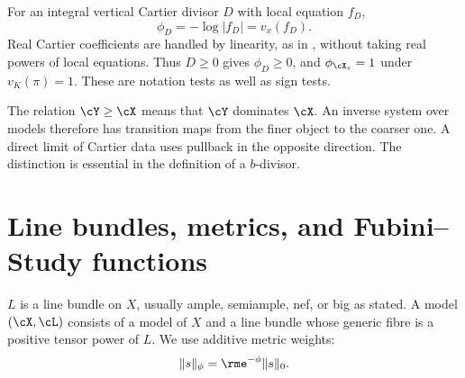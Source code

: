 For an integral vertical Cartier divisor \(D\) with local equation \(f_D\),
\[
 \phi_D=-\log|f_D|=v_x(f_D).
\]
Real Cartier coefficients are handled by linearity, as in
, without taking real powers of local equations.
Thus \(D\geq0\) gives \(\phi_D\geq0\), and
\(\phi_{\cX_s}=1\) under \(v_K(\pi)=1\).
These are notation tests as well as sign tests.

The relation \(\cY\geq\cX\) means that \(\cY\) dominates \(\cX\).
An inverse system over models therefore has transition maps from the
finer object to the coarser one.  A direct limit of Cartier data uses
pullback in the opposite direction.  The distinction is essential in
the definition of a \(b\)-divisor.

\section{Line bundles, metrics, and Fubini--Study functions}
\label{sec:appK-metrics}


\(L\) is a line bundle on \(X\), usually ample, semiample, nef, or big as
stated.  A model \((\cX,\cL)\) consists of a model of \(X\) and a line bundle
whose generic fibre is a positive tensor power of \(L\).  We use additive
metric weights:
\[
 \|s\|_\phi=\rme^{-\phi}\|s\|_0.
\]

